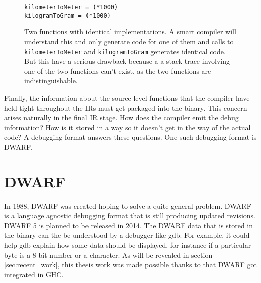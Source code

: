 \begin{figure}
\begin{mdframed}
  \begin{verbatim}
kilometerToMeter = (*1000)
kilogramToGram = (*1000)
  \end{verbatim}
  \caption{Two functions with identical implementations. A smart compiler
    will understand this and only generate code for one of them and
    calls to \texttt{kilometerToMeter} and \texttt{kilogramToGram}
    generates identical code. But this have a serious drawback because a
    a stack trace involving one of the two functions can't exist, as
    the two functions are indistinguishable.}
  \label{fig:same_functions}
\end{mdframed}
\end{figure}

Finally, the information  about the source-level functions that the compiler
have held tight throughout the IRs must get packaged into the binary. This
concern arises naturally in the final IR stage.  How does the compiler emit the
debug information? How is it stored in a way so it doesn't get in the way of the
actual code?  A debugging format answers these questions. One such debugging
format is DWARF.

\section{DWARF}

In 1988, DWARF was created hoping to solve a quite general problem. DWARF is
a language agnostic debugging format that is still producing updated revisions.
DWARF 5 is planned to be released in 2014. \cite{eager2012introduction} The DWARF data that is
stored in the binary can the be understood by a debugger like gdb. For example,
it could help gdb explain how some data should be displayed, for instance if a
particular byte is a 8-bit number or a character. As will be revealed in
section \ref{sec:recent_work}, this thesis work was made possible thanks
to that DWARF got integrated in GHC.
